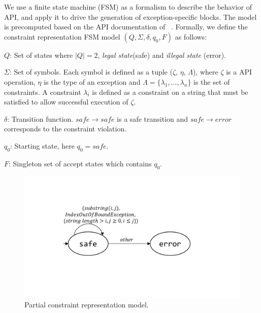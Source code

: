 
  We use a finite state
machine
(FSM) as a formalism to describe the behavior of \java\  API, and 
apply it to drive the generation of exception-specific  blocks. The
model is precomputed based on the API documentation of \java\ .
Formally, we define the constraint representation FSM model $(Q, \Sigma, \delta,
q_0, F)$ as follows:
\begin{mybullet}
 \item $Q$: Set of states where $|Q| = 2$, \emph{legal state}(safe) and
\emph{illegal state} (error).

 \item $\Sigma$: Set of symbols. Each symbol is defined as a tuple ($\zeta$,
$\eta$, $\Lambda$), where $\zeta$ is a  API operation, $\eta$ is
the type of an exception and $\Lambda = \{\lambda_1, \ldots, \lambda_n\}$  is
the set of constraints. A constraint $\lambda_i$ is defined as a constraint on
a string that must be satisfied to allow successful execution of $\zeta$.

 \item $\delta$: Transition function. $safe \rightarrow safe$ is a safe
transition and $safe \rightarrow error$ corresponds to the constraint violation.

 \item $q_0$: Starting state, here $q_0 = safe$.

 \item $F$: Singleton set of accept states which contains $q_0$.
\end{mybullet}

\begin{figure}[t]
\centering
\includegraphics[scale=.25]{images/automataString.pdf}
\caption{Partial constraint representation model.}
\label{fig:constraintautomata}
\end{figure}


